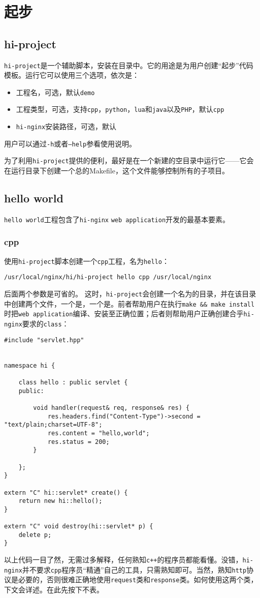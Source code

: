 \section{起步}
\subsection{hi-project}
\texttt{hi-project}是一个辅助脚本，安装在目录中。它的用途是为用户创建“起步”代码模板。运行它可以使用三个选项，依次是：
\begin{itemize}
\item 工程名，可选，默认\texttt{demo}
\item 工程类型，可选，支持\texttt{cpp}，\texttt{python}，\texttt{lua}和\texttt{java}以及\texttt{PHP}，默认\texttt{cpp}
\item \texttt{hi-nginx}安装路径，可选，默认
\end{itemize}
用户可以通过\texttt{-h}或者\texttt{--help}参看使用说明。

为了利用\texttt{hi-project}提供的便利，最好是在一个新建的空目录中运行它——它会在运行目录下创建一个总的Makefile，这个文件能够控制所有的子项目。

\subsection{hello world}
\texttt{hello world}工程包含了\texttt{hi-nginx} \texttt{web application}开发的最基本要素。
\subsubsection{cpp}
使用\texttt{hi-project}脚本创建一个\texttt{cpp}工程，名为\texttt{hello}：
\begin{lstlisting}
/usr/local/nginx/hi/hi-project hello cpp /usr/local/nginx
\end{lstlisting}
后面两个参数是可省的。
这时，\texttt{hi-project}会创建一个名为的目录，并在该目录中创建两个文件，一个是，一个是。前者帮助用户在执行\texttt{make \&\& make install }时把\texttt{web application}编译、安装至正确位置；后者则帮助用户正确创建合乎\texttt{hi-nginx}要求的\texttt{class}：
\begin{lstlisting}
#include "servlet.hpp"


namespace hi {

    class hello : public servlet {
    public:

        void handler(request& req, response& res) {
            res.headers.find("Content-Type")->second = "text/plain;charset=UTF-8";
            res.content = "hello,world";
            res.status = 200;
        }

    };
}

extern "C" hi::servlet* create() {
    return new hi::hello();
}

extern "C" void destroy(hi::servlet* p) {
    delete p;
}
\end{lstlisting}
以上代码一目了然，无需过多解释，任何熟知\texttt{c++}的程序员都能看懂。没错，\texttt{hi-nginx}并不要求\texttt{cpp}程序员“精通”自己的工具，只需熟知即可。当然，熟知\texttt{http}协议是必要的，否则很难正确地使用\texttt{request}类和\texttt{response}类。如何使用这两个类，下文会详述。在此先按下不表。


